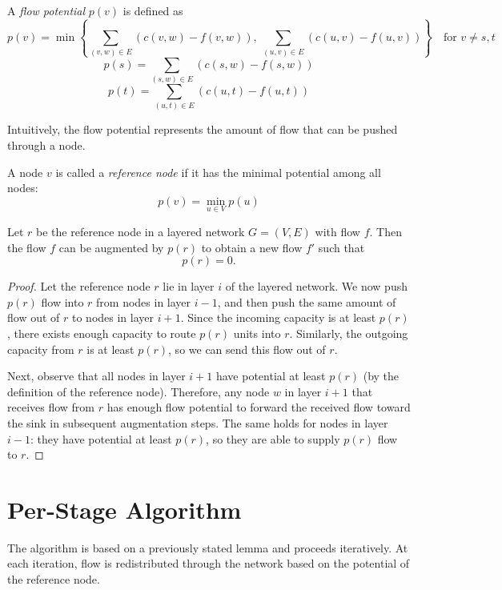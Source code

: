 \begin{defn}
A \emph{flow potential} $p(v)$ is defined as
$$
p(v) = \min \left\lbrace \sum_{(v,w) \in E} (c(v,w) - f(v,w)),\ \sum_{(u,v) \in E} (c(u,v) - f(u,v)) \right\rbrace \quad \text{for } v \neq s,t
$$
$$
p(s) = \sum_{(s,w) \in E} (c(s,w) - f(s,w))
$$
$$
p(t) = \sum_{(u,t) \in E} (c(u,t) - f(u,t))
$$
\end{defn}

Intuitively, the flow potential represents the amount of flow that can be pushed through a node.

\begin{defn}
A node $v$ is called a \emph{reference node} if it has the minimal potential among all nodes:
$$
p(v) = \min_{u \in V} p(u)
$$
\end{defn}

\begin{lemma}
Let $r$ be the reference node in a layered network $G = (V, E)$ with flow $f$.  
Then the flow $f$ can be augmented by $p(r)$ to obtain a new flow $f'$ such that $$p(r) = 0.$$
\end{lemma}

\begin{proof}
Let the reference node $r$ lie in layer $i$ of the layered network. We now push $p(r)$ flow into $r$ from nodes in layer $i-1$, and then push the same amount of flow out of $r$ to nodes in layer $i+1$. Since the incoming capacity is at least $p(r)$, there exists enough capacity to route $p(r)$ units into $r$. Similarly, the outgoing capacity from $r$ is at least $p(r)$, so we can send this flow out of $r$.

Next, observe that all nodes in layer $i+1$ have potential at least $p(r)$ (by the definition of the reference node). Therefore, any node $w$ in layer $i+1$ that receives flow from $r$ has enough flow potential to forward the received flow toward the sink in subsequent augmentation steps. The same holds for nodes in layer $i-1$: they have potential at least $p(r)$, so they are able to supply $p(r)$ flow to $r$.
\end{proof}

\section{Per-Stage Algorithm}

The algorithm is based on a previously stated lemma and proceeds iteratively. At each iteration, flow is redistributed through the network based on the potential of the reference node.

